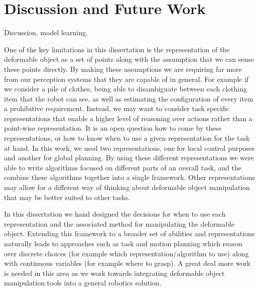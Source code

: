 \chapter{Discussion and Future Work}





Discussion, model learning.

One of the key limitations in this dissertation is the representation of the deformable object as a set of points along with the assumption that we can sense these points directly. By making these assumptions we are requiring far more from our perception systems that they are capable of in general. For example if we consider a pile of clothes, being able to disambiguate between each clothing item that the robot can see, as well as estimating the configuration of every item a prohibitive requirement. Instead, we may want to consider task specific representations that enable a higher level of reasoning over actions rather than a point-wise representation. It is an open question how to come by these representations, or how to know when to use a given representation for the task at hand. In this work, we used two representations, one for local control purposes and another for global planning. By using these different representations we were able to write algorithms focused on different parts of an overall task, and the combine these algorithms together into a single framework. Other representations may allow for a different way of thinking about deformable object manipulation that may be better suited to other tasks.

In this dissertation we hand designed the decisions for when to use each representation and the associated method for manipulating the deformable object. Extending this framework to a broader set of abilities and representations naturally leads to approaches such as task and motion planning which reason over discrete choices (for example which representation/algorithm to use) along with continuous variables (for example where to grasp). A great deal more work is needed in this area as we work towards integrating deformable object manipulation tools into a general robotics solution.

